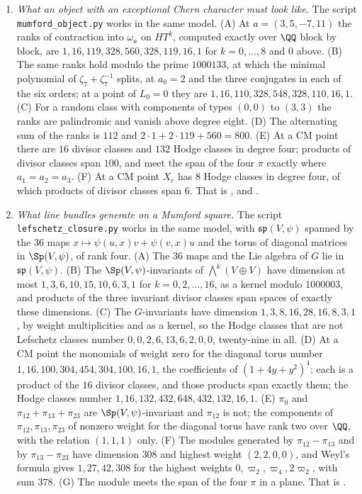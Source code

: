\begin{enumerate}[label=\textup{(\Roman*)},leftmargin=*]
\item \emph{What an object with an exceptional Chern character must look
  like.} The script \texttt{mumford\_\allowbreak object.py} works in the same
  model. (A) At $a=(3,5,-7,11)$ the ranks of contraction into $\omega_{a}$ on
  $HT^{k}$, computed exactly over $\QQ$ block by block, are
  $1,16,119,328,560,328,119,16,1$ for $k=0,\dots,8$ and $0$ above. (B) The
  same ranks hold modulo the prime $1000133$, at which the minimal polynomial
  of $\zeta_{7}+\zeta_{7}^{-1}$ splits, at $a_{0}=2$ and the three conjugates
  in each of the six orders; at a point of $L_{0}=0$ they are
  $1,16,110,328,548,328,110,16,1$. (C) For a random class with components of
  types $(0,0)$ to $(3,3)$ the ranks are palindromic and vanish above degree
  eight. (D) The alternating sum of the ranks is $112$ and
  $2\cdot1+2\cdot119+560=800$. (E) At a CM point there are $16$ divisor
  classes and $132$ Hodge classes in degree four; products of divisor classes
  span $100$, and meet the span of the four $\pi$ exactly where
  $a_{1}=a_{2}=a_{3}$. (F) At a CM point $X_{c}$ has $8$ Hodge classes in
  degree four, of which products of divisor classes span $6$. That is
  ,  and
  .

\item \emph{What line bundles generate on a Mumford square.} The script
  \texttt{lefschetz\_\allowbreak closure.py} works in the same model, with
  $\mathfrak{sp}(V,\psi)$ spanned by the $36$ maps $x\mapsto\psi(u,x)v+
  \psi(v,x)u$ and the torus of diagonal matrices in $\Sp(V,\psi)$, of rank
  four. (A) The $36$ maps and the Lie algebra of $G$ lie in
  $\mathfrak{sp}(V,\psi)$. (B) The $\Sp(V,\psi)$-invariants of
  ${\textstyle\bigwedge^{k}}(V\oplus V)$ have dimension at most $1,3,6,10,15,10,6,3,1$ for
  $k=0,2,\dots,16$, as a kernel modulo $1000003$, and products of the three
  invariant divisor classes span spaces of exactly these dimensions. (C) The
  $G$-invariants have dimension $1,3,8,16,28,16,8,3,1$, by weight
  multiplicities and as a kernel, so the Hodge classes that are not
  Lefschetz classes number $0,0,2,6,13,6,2,0,0$, twenty-nine in all. (D) At
  a CM point the monomials of weight zero for the diagonal torus number
  $1,16,100,304,454,304,100,16,1$, the coefficients of $(1+4y+y^{2})^{4}$;
  each is a product of the $16$ divisor classes, and those products span
  exactly them; the Hodge classes number $1,16,132,432,648,432,132,16,1$. (E)
  $\pi_{0}$ and $\pi_{12}+\pi_{13}+\pi_{23}$ are $\Sp(V,\psi)$-invariant and
  $\pi_{12}$ is not; the components of $\pi_{12},\pi_{13},\pi_{23}$ of
  nonzero weight for the diagonal torus have rank two over $\QQ$, with the
  relation $(1,1,1)$ only. (F) The modules generated by $\pi_{12}-\pi_{13}$
  and by $\pi_{13}-\pi_{23}$ have dimension $308$ and highest weight
  $(2,2,0,0)$, and Weyl's formula gives $1,27,42,308$ for the highest weights
  $0,\varpi_{2},\varpi_{4},2\varpi_{2}$, with sum $378$. (G) The module meets
  the span of the four $\pi$ in a plane. That is
  .


\end{enumerate}
